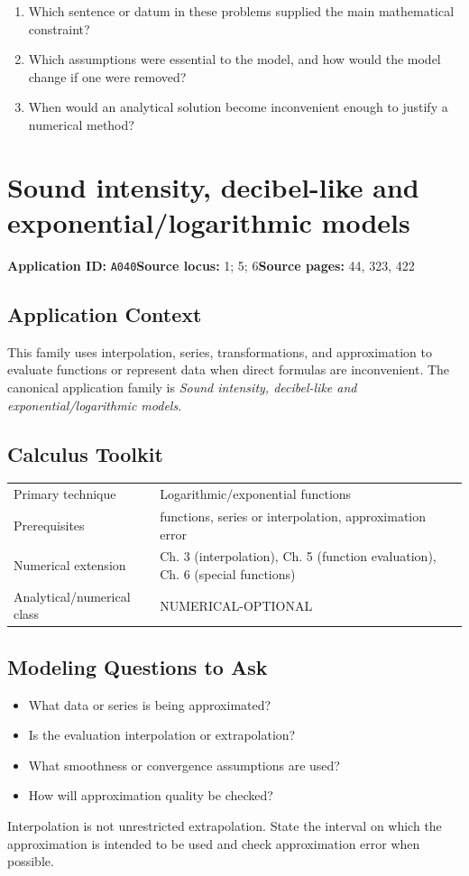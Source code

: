 \documentclass[11pt]{book}
\newcommand{\pid}[1]{\texttt{#1}}
\begin{document}
\begin{reflectionbox}\begin{enumerate}
\item Which sentence or datum in these problems supplied the main mathematical constraint?
\item Which assumptions were essential to the model, and how would the model change if one were removed?
\item When would an analytical solution become inconvenient enough to justify a numerical method?
\end{enumerate}\end{reflectionbox}
\chapter{Sound intensity, decibel-like and exponential/logarithmic models}\label{app:A040}
\textbf{Application ID:} \pid{A040}\quad \textbf{Source locus:} 1; 5; 6\quad \textbf{Source pages:} 44, 323, 422
\section*{Application Context}
This family uses interpolation, series, transformations, and approximation to evaluate functions or represent data when direct formulas are inconvenient. The canonical application family is \emph{Sound intensity, decibel-like and exponential/logarithmic models}.
\section*{Calculus Toolkit}
\begin{tabularx}{\textwidth}{@{}lX@{}}\toprule
Primary technique & Logarithmic/exponential functions \\
Prerequisites & functions, series or interpolation, approximation error \\
Numerical extension & Ch. 3 (interpolation), Ch. 5 (function evaluation), Ch. 6 (special functions) \\
Analytical/numerical class & NUMERICAL-OPTIONAL \\
\bottomrule\end{tabularx}
\section*{Modeling Questions to Ask}\begin{itemize}
\item What data or series is being approximated?
\item Is the evaluation interpolation or extrapolation?
\item What smoothness or convergence assumptions are used?
\item How will approximation quality be checked?
\end{itemize}
\begin{errorbox}Interpolation is not unrestricted extrapolation. State the interval on which the approximation is intended to be used and check approximation error when possible.\end{errorbox}
\end{document}
